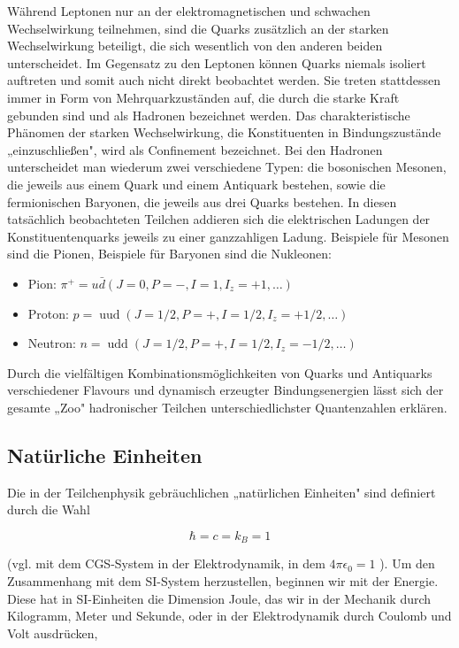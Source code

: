 \documentclass[10pt, letterpaper]{article}
\begin{document}
Während Leptonen nur an der elektromagnetischen und schwachen Wechselwirkung teilnehmen, sind die Quarks zusätzlich an der starken Wechselwirkung beteiligt, die sich wesentlich von den anderen beiden unterscheidet. Im Gegensatz zu den Leptonen können Quarks niemals isoliert auftreten und somit auch nicht direkt beobachtet werden. Sie treten stattdessen immer in Form von Mehrquarkzuständen auf, die durch die starke Kraft gebunden sind und als Hadronen bezeichnet werden. Das charakteristische Phänomen der starken Wechselwirkung, die Konstituenten in Bindungszustände „einzuschließen", wird als Confinement bezeichnet. Bei den Hadronen unterscheidet man wiederum zwei verschiedene Typen: die bosonischen Mesonen, die jeweils aus einem Quark und einem Antiquark bestehen, sowie die fermionischen Baryonen, die jeweils aus drei Quarks bestehen. In diesen tatsächlich beobachteten Teilchen addieren sich die elektrischen Ladungen der Konstituentenquarks jeweils zu einer ganzzahligen Ladung. Beispiele für Mesonen sind die Pionen, Beispiele für Baryonen sind die Nukleonen:

\begin{itemize}
  \item Pion: $\pi^{+}=u \bar{d}\left(J=0, P=-, I=1, I_{z}=+1, \ldots\right)$
  \item Proton: $p=\operatorname{uud}\left(J=1 / 2, P=+, I=1 / 2, I_{z}=+1 / 2, \ldots\right)$
  \item Neutron: $n=\operatorname{udd}\left(J=1 / 2, P=+, I=1 / 2, I_{z}=-1 / 2, \ldots\right)$
\end{itemize}

Durch die vielfältigen Kombinationsmöglichkeiten von Quarks und Antiquarks verschiedener Flavours und dynamisch erzeugter Bindungsenergien lässt sich der gesamte „Zoo" hadronischer Teilchen unterschiedlichster Quantenzahlen erklären.

\subsection*{Natürliche Einheiten}
Die in der Teilchenphysik gebräuchlichen „natürlichen Einheiten" sind definiert durch die Wahl

$$
\hbar=c=k_{B}=1
$$

(vgl. mit dem CGS-System in der Elektrodynamik, in dem $4 \pi \epsilon_{0}=1$ ). Um den Zusammenhang mit dem SI-System herzustellen, beginnen wir mit der Energie. Diese hat in SI-Einheiten die Dimension Joule, das wir in der Mechanik durch Kilogramm, Meter und Sekunde, oder in der Elektrodynamik durch Coulomb und Volt ausdrücken,
\end{document}

